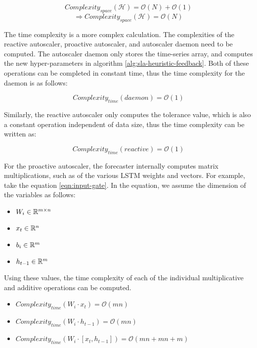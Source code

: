 \[Complexity_{space}(\mathcal{H}) = \mathcal{O}(N) + \mathcal{O}(1)\]
\begin{equation}
    \Rightarrow Complexity_{space}(\mathcal{H}) = \mathcal{O}(N)
\end{equation}

The time complexity is a more complex calculation. The complexities of the reactive autoscaler, proactive autoscaler, and autoscaler daemon need to be computed. The autoscaler daemon only stores the time-series array, and computes the new hyper-parameters in algorithm \ref{alg:sla-heuristic-feedback}. Both of these operations can be completed in constant time, thus the time complexity for the daemon is as follows:

\begin{equation}
    Complexity_{time}(daemon) = \mathcal{O}(1)
\end{equation}

Similarly, the reactive autoscaler only computes the tolerance value, which is also a constant operation independent of data size, thus the time complexity can be written as:

\begin{equation}
    Complexity_{time}(reactive) = \mathcal{O}(1)
\end{equation}

For the proactive autoscaler, the forecaster internally computes matrix multiplications, such as of the various LSTM weights and vectors. For example, take the equation \ref{eqn:input-gate}. In the equation, we assume the dimension of the variables as follows:

\begin{itemize}
    \item $W_{i} \in \mathbb{R}^{m \times n}$
    \item $x_{t} \in \mathbb{R}^{n}$
    \item $b_{i} \in \mathbb{R}^{m}$
    \item $h_{t-1} \in \mathbb{R}^{m}$
\end{itemize}

Using these values, the time complexity of each of the individual multiplicative and additive operations can be computed.

\begin{itemize}
    \item $Complexity_{time}(W_{i} \cdot x_{t}) = \mathcal{O}(mn)$
    \item $Complexity_{time}(W_{i} \cdot h_{t-1}) = \mathcal{O}(mn)$
    \item $Complexity_{time}(W_{i} \cdot [x_{t}, h_{t-1}]) = \mathcal{O}(mn + mn + m)$
\end{itemize}

